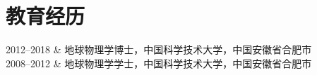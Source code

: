 \section{教育经历}

\begin{EntriesTable}{0.18}{0.02}{0.80}
2012--2018 & 地球物理学博士，中国科学技术大学，中国安徽省合肥市 \\
2008--2012 & 地球物理学学士，中国科学技术大学，中国安徽省合肥市 \\
\end{EntriesTable}
